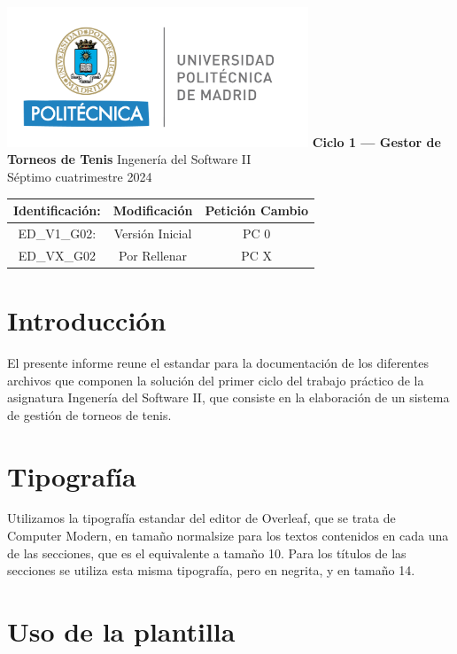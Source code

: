 \documentclass[titlepage,a4paper]{article}
\begin{document}
\begin{titlepage} %
	\hfill\includegraphics[width=9cm]{logoupm.png}
    \centering
    \vfill
    \Huge \textbf{Ciclo 1 — Gestor de Torneos de Tenis}
    \vskip2cm
    \Large Ingenería del Software II\\
    Séptimo cuatrimestre 2024 
    \vfill
    \begin{tabular}{ | c | c | c | } %
      \hline
      Identificación: & Modificación & Petición Cambio \\ \hline 
      ED\_V1\_G02: & Versión Inicial & PC 0 \\ \hline
      ED\_VX\_G02 & Por Rellenar & PC X \\ \hline
  	\end{tabular}
    \vfill
    \vfill
\end{titlepage}

\tableofcontents %
\newpage

\section{Introducción}\label{sec:intro} %
El presente informe reune el estandar para la documentación de los diferentes archivos que componen la solución del primer ciclo del trabajo práctico de la asignatura Ingenería del Software II, que consiste en la elaboración de un sistema de gestión de torneos de tenis. 

\section{Tipografía}\label{sec:tipo}

Utilizamos la tipografía estandar del editor de Overleaf, que se trata de Computer Modern, en tamaño normalsize para los textos contenidos en cada una de las secciones, que es el equivalente a tamaño 10. Para los títulos de las secciones se utiliza esta misma tipografía, pero en negrita, y en tamaño 14. 

\section{Uso de la plantilla}\label{sec:modelo}
\end{document}
